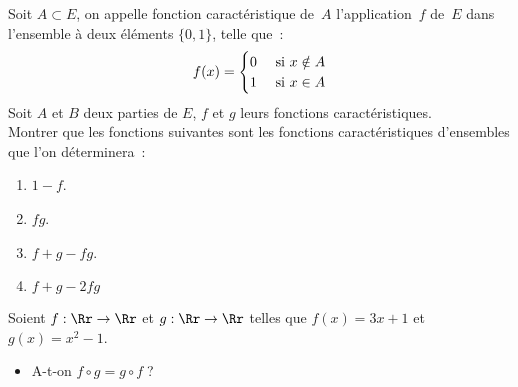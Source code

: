 \documentclass[10pt, a4paper, twocolumn]{homework}
\begin{document}
 \exercice
Soit $A\subset E$, on appelle fonction caractéristique de~$A$
l'application~$f$ de~$E$ dans l'ensemble à deux éléments $\{0, 1\}$, telle
que~:
$$f(x)=\begin{cases}
0&  \text{ si } x\notin A \cr 1& \text{ si } x \in A \cr
\end{cases}$$
Soit $A$ et $B$ deux parties de $E$, $f$ et $g$ leurs fonctions
caractéristiques.\\
Montrer que les fonctions suivantes sont les fonctions
caractéristiques d'ensembles que l'on déterminera~:
\begin{enumerate}
\item $1-f$.
\item $fg$.
\item $f+g-fg$.
\item $f + g - 2fg$
\end{enumerate}
\exercice
Soient $f : \Rr \rightarrow \Rr$ et $g : \Rr \rightarrow \Rr$ telles que $f(x) =
3x+1$ et $g(x)=x^2-1$.
\begin{itemize}
  \item  A-t-on $f\circ g=g\circ f\;$?
\end{itemize}
\end{document}
